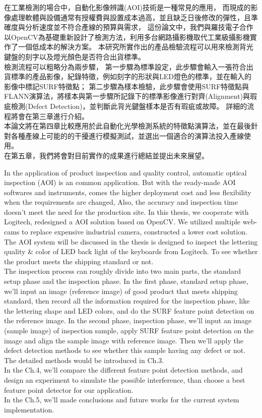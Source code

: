 \begin{abstractzh}
在工業檢測的場合中，自動化影像辨識(AOI)技術是一種常見的應用，
而現成的影像處理軟體與設備通常有授權費與設置成本過高，並且缺乏日後修改的彈性，且準確度與分析速度並不符合產線的預算與需求，
這份論文中，我們與羅技電子合作以OpenCV為基礎重新設計了檢測方法，利用多台網路攝影機取代工業級攝影機實作了一個低成本的解決方案。
本研究所實作出的產品檢驗流程可以用來檢測背光鍵盤的刻字以及燈光顏色是否符合出貨標準。\\
檢測流程可以粗略分為兩步驟，
第一步驟為標準設定，此步驟會輸入一張符合出貨標準的產品影像，紀錄特徵，例如刻字的形狀與LED燈色的標準，並在輸入的影像中標記SURF特徵點；
第二步驟為樣本檢驗，此步驟會使用SURF特徵點與FLANN演算法，將樣本與第一步驟所記錄下的標準影像進行對齊(Alignment)與瑕疵檢測(Defect Detection)，並判斷此背光鍵盤樣本是否有瑕疵或故障。
詳細的流程將會在第三章進行介紹。\\
本論文將在第四章比較應用於此自動化光學檢測系統的特徵點演算法，並在最後針對各種產線上可能的的干擾進行模擬測試，並選出一個適合的演算法投入產線使用。\\
在第五章，我們將會對目前實作的成果進行總結並提出未來展望。

\end{abstractzh}

\begin{abstracten}
In the application of product inspection and quality control, automatic optical inspection (AOI) is an common application.
But with the ready-made AOI softwares and instruments, comes the higher deployment cost and less flexibility when the requirements are changed, Also, the accuracy and inspection time doesn't meet the need for the production site.
In this thesis, we cooperate with Logitech, redesigned a AOI solution based on OpenCV.
We utilized multiple web-cams to replace expensive industrial camera, constructed a lower cost solution.
The AOI system will be discussed in the thesis is designed to inspect the lettering quality \& color of LED back light of the keyboards from Logitech. To see whether the product meets the shipping standard or not.\\
The inspection process can roughly divide into two main parts, the standard setup phase and the inspection phase.
In the first phase, standard setup phase, we'll input an image (reference image) of good product that meets shipping standard, then record all the information required for the inspection phase, like the lettering shape and LED colors, and do the SURF feature point detection on the reference image.
In the second phase, inspection phase, we'll input an image (sample image) of inspection sample, apply SURF feature point detection on the image and align the sample image with reference image. Then we'll apply the defect detection methods to see whether this sample having any defect or not.
The detailed methods would be introduced in Ch.3.\\
In the Ch.4, we'll compare the different feature point detection methods, and design an experiment to simulate the possible interference, than choose a best feature point detector for our application.\\
In the Ch.5, we'll made conclusions and future works for the current system implementation. 

\end{abstracten}